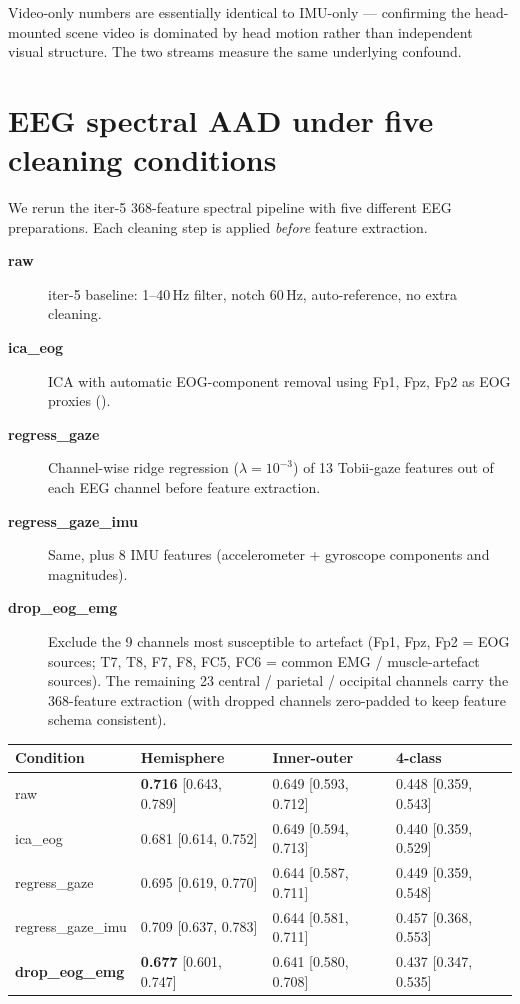 \noindent
Video-only numbers are essentially identical to IMU-only --- confirming
the head-mounted scene video is dominated by head motion rather than
independent visual structure. The two streams measure the same
underlying confound.

\section{EEG spectral AAD under five cleaning conditions}

We rerun the iter-5 368-feature spectral pipeline with five different
EEG preparations. Each cleaning step is applied \emph{before} feature
extraction.

\begin{description}
  \item[\textbf{raw}] iter-5 baseline: 1--40\,Hz filter, notch 60\,Hz,
        auto-reference, no extra cleaning.
  \item[\textbf{ica\_eog}] ICA with automatic EOG-component removal
        using Fp1, Fpz, Fp2 as EOG proxies
        ().
  \item[\textbf{regress\_gaze}] Channel-wise ridge regression
        ($\lambda=10^{-3}$) of 13 Tobii-gaze features out of each EEG
        channel before feature extraction.
  \item[\textbf{regress\_gaze\_imu}] Same, plus 8 IMU features
        (accelerometer + gyroscope components and magnitudes).
  \item[\textbf{drop\_eog\_emg}] Exclude the 9 channels most susceptible
        to artefact (Fp1, Fpz, Fp2 = EOG sources; T7, T8, F7, F8, FC5,
        FC6 = common EMG / muscle-artefact sources). The remaining 23
        central / parietal / occipital channels carry the 368-feature
        extraction (with dropped channels zero-padded to keep feature
        schema consistent).
\end{description}

\begin{table}[ht]
\centering
\begin{tabular}{llll}
\toprule
Condition & Hemisphere & Inner-outer & 4-class \\
\midrule
raw                 & \textbf{0.716} [0.643, 0.789] & 0.649 [0.593, 0.712] & 0.448 [0.359, 0.543] \\
ica\_eog            & 0.681 [0.614, 0.752]           & 0.649 [0.594, 0.713] & 0.440 [0.359, 0.529] \\
regress\_gaze       & 0.695 [0.619, 0.770]           & 0.644 [0.587, 0.711] & 0.449 [0.359, 0.548] \\
regress\_gaze\_imu  & 0.709 [0.637, 0.783]           & 0.644 [0.581, 0.711] & 0.457 [0.368, 0.553] \\
\textbf{drop\_eog\_emg} & \textbf{0.677} [0.601, 0.747] & 0.641 [0.580, 0.708] & 0.437 [0.347, 0.535] \\
\bottomrule
\end{tabular}
\end{table}

